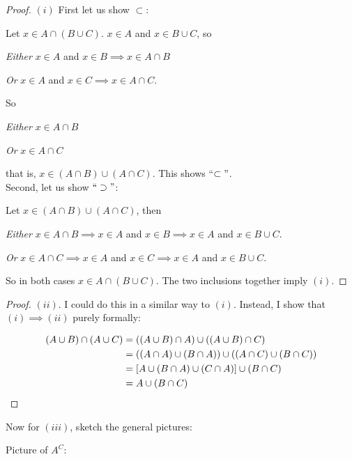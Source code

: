 \documentclass[twoside]{scrartcl}
\begin{document}
\begin{proof} $(i)$
First let us show $\subset$:

Let $x \in A \cap (B \cup C)$. $x \in A$ and $x \in B \cup C$, so 

\emph{Either} $x \in A$ and $x \in B \implies x \in A\cap B$

\emph{Or} $x \in A$ and $x \in C \implies x \in A \cap C$. 	

So 

\emph{Either} $x \in A \cap B$

\emph{Or} $x \in A\cap C$	

that is, $x \in (A \cap B) \cup (A \cap C)$. This shows ``$\subset"$.\\

Second, let us show $``\supset"$: 

Let $x \in (A\cap B)\cup (A\cap C)$, then 

\emph{Either} $x \in A\cap B \implies x \in A$ and $x \in B \implies x \in A$ and $x \in B \cup C$. 

\emph{Or} $x \in A\cap C \implies x \in A$ and $x \in C \implies x \in A$ and $x \in B \cup C$. 

So in both cases $x \in A \cap (B \cup C)$. The two inclusions together imply $(i)$. 
\end{proof}


\begin{proof} $(ii)$. I could do this in a similar way to $(i)$. Instead, I show that $(i) \implies (ii)$ purely formally: 

\[
\begin{aligned}
  (A \cup B)\cap (A \cup C) &= ((A\cup B)\cap A)\cup ((A \cup B)\cap C)\\
  &= ((A\cap A)\cup (B\cap A))\cup ((A\cap C)\cup (B\cap C))\\
  &= [A \cup (B\cap A)\cup (C\cap A)] \cup (B\cap C)\\
  &= A \cup (B \cap C)\qedhere
\end{aligned}
\]
\end{proof}

Now for $(iii)$, sketch the general pictures:

Picture of $A^C$: 
\begin{center}
\end{center}
\end{document}
